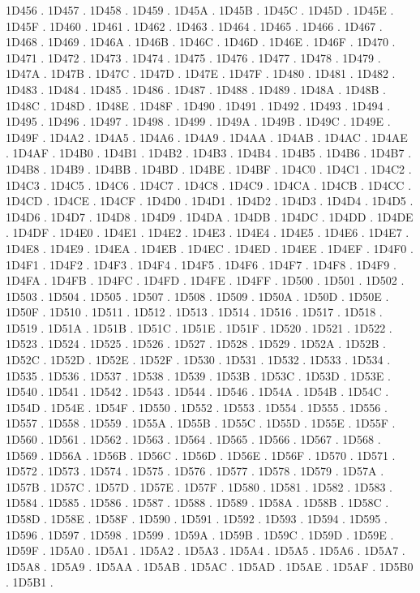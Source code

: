 1D456 .
1D457 .
1D458 .
1D459 .
1D45A .
1D45B .
1D45C .
1D45D .
1D45E .
1D45F .
1D460 .
1D461 .
1D462 .
1D463 .
1D464 .
1D465 .
1D466 .
1D467 .
1D468 .
1D469 .
1D46A .
1D46B .
1D46C .
1D46D .
1D46E .
1D46F .
1D470 .
1D471 .
1D472 .
1D473 .
1D474 .
1D475 .
1D476 .
1D477 .
1D478 .
1D479 .
1D47A .
1D47B .
1D47C .
1D47D .
1D47E .
1D47F .
1D480 .
1D481 .
1D482 .
1D483 .
1D484 .
1D485 .
1D486 .
1D487 .
1D488 .
1D489 .
1D48A .
1D48B .
1D48C .
1D48D .
1D48E .
1D48F .
1D490 .
1D491 .
1D492 .
1D493 .
1D494 .
1D495 .
1D496 .
1D497 .
1D498 .
1D499 .
1D49A .
1D49B .
1D49C .
1D49E .
1D49F .
1D4A2 .
1D4A5 .
1D4A6 .
1D4A9 .
1D4AA .
1D4AB .
1D4AC .
1D4AE .
1D4AF .
1D4B0 .
1D4B1 .
1D4B2 .
1D4B3 .
1D4B4 .
1D4B5 .
1D4B6 .
1D4B7 .
1D4B8 .
1D4B9 .
1D4BB .
1D4BD .
1D4BE .
1D4BF .
1D4C0 .
1D4C1 .
1D4C2 .
1D4C3 .
1D4C5 .
1D4C6 .
1D4C7 .
1D4C8 .
1D4C9 .
1D4CA .
1D4CB .
1D4CC .
1D4CD .
1D4CE .
1D4CF .
1D4D0 .
1D4D1 .
1D4D2 .
1D4D3 .
1D4D4 .
1D4D5 .
1D4D6 .
1D4D7 .
1D4D8 .
1D4D9 .
1D4DA .
1D4DB .
1D4DC .
1D4DD .
1D4DE .
1D4DF .
1D4E0 .
1D4E1 .
1D4E2 .
1D4E3 .
1D4E4 .
1D4E5 .
1D4E6 .
1D4E7 .
1D4E8 .
1D4E9 .
1D4EA .
1D4EB .
1D4EC .
1D4ED .
1D4EE .
1D4EF .
1D4F0 .
1D4F1 .
1D4F2 .
1D4F3 .
1D4F4 .
1D4F5 .
1D4F6 .
1D4F7 .
1D4F8 .
1D4F9 .
1D4FA .
1D4FB .
1D4FC .
1D4FD .
1D4FE .
1D4FF .
1D500 .
1D501 .
1D502 .
1D503 .
1D504 .
1D505 .
1D507 .
1D508 .
1D509 .
1D50A .
1D50D .
1D50E .
1D50F .
1D510 .
1D511 .
1D512 .
1D513 .
1D514 .
1D516 .
1D517 .
1D518 .
1D519 .
1D51A .
1D51B .
1D51C .
1D51E .
1D51F .
1D520 .
1D521 .
1D522 .
1D523 .
1D524 .
1D525 .
1D526 .
1D527 .
1D528 .
1D529 .
1D52A .
1D52B .
1D52C .
1D52D .
1D52E .
1D52F .
1D530 .
1D531 .
1D532 .
1D533 .
1D534 .
1D535 .
1D536 .
1D537 .
1D538 .
1D539 .
1D53B .
1D53C .
1D53D .
1D53E .
1D540 .
1D541 .
1D542 .
1D543 .
1D544 .
1D546 .
1D54A .
1D54B .
1D54C .
1D54D .
1D54E .
1D54F .
1D550 .
1D552 .
1D553 .
1D554 .
1D555 .
1D556 .
1D557 .
1D558 .
1D559 .
1D55A .
1D55B .
1D55C .
1D55D .
1D55E .
1D55F .
1D560 .
1D561 .
1D562 .
1D563 .
1D564 .
1D565 .
1D566 .
1D567 .
1D568 .
1D569 .
1D56A .
1D56B .
1D56C .
1D56D .
1D56E .
1D56F .
1D570 .
1D571 .
1D572 .
1D573 .
1D574 .
1D575 .
1D576 .
1D577 .
1D578 .
1D579 .
1D57A .
1D57B .
1D57C .
1D57D .
1D57E .
1D57F .
1D580 .
1D581 .
1D582 .
1D583 .
1D584 .
1D585 .
1D586 .
1D587 .
1D588 .
1D589 .
1D58A .
1D58B .
1D58C .
1D58D .
1D58E .
1D58F .
1D590 .
1D591 .
1D592 .
1D593 .
1D594 .
1D595 .
1D596 .
1D597 .
1D598 .
1D599 .
1D59A .
1D59B .
1D59C .
1D59D .
1D59E .
1D59F .
1D5A0 .
1D5A1 .
1D5A2 .
1D5A3 .
1D5A4 .
1D5A5 .
1D5A6 .
1D5A7 .
1D5A8 .
1D5A9 .
1D5AA .
1D5AB .
1D5AC .
1D5AD .
1D5AE .
1D5AF .
1D5B0 .
1D5B1 .
